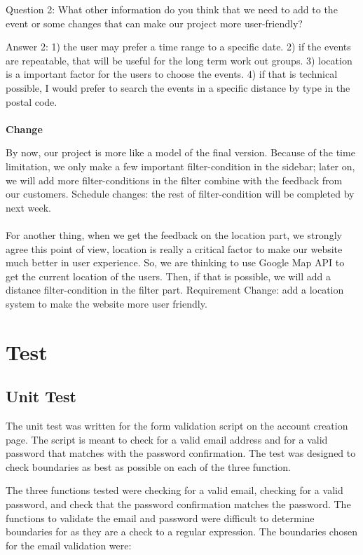\documentclass[a4paper]{article}
\begin{document}
Question 2: What other information do you think that we need to add to the event or some changes that can make our project more user-friendly?

Answer 2: 1) the user may prefer a time range to a specific date.
	     2) if the events are repeatable, that will be useful for the long term work out groups.
	     3) location is a important factor for the users to choose the events.
                 4) if that is technical possible, I would prefer to search the events in a specific distance by type in the postal code.
\\
\\
\textbf{Change}

By now, our project is more like a model of the final version. Because of the time limitation, we only make a few important filter-condition in the sidebar; later on, we will add more filter-conditions in the filter combine with the feedback from our customers. 
Schedule changes: the rest of filter-condition will be completed by next week. 
\\
\\
For another thing, when we get the feedback on the location part, we strongly agree this point of view, location is really a critical factor to make our website much better in user experience. So, we are thinking to use Google Map API to get the current location of the users. Then, if that is possible, we will add a distance filter-condition in the filter part.
Requirement Change: add a location system to make the website more user friendly.



\section{Test}
\subsection{Unit Test}

The unit test was written for the form validation script on the account creation page.
The script is meant to check for a valid email address and for a valid password that matches with the password confirmation.
The test was designed to check boundaries as best as possible on each of the three function.

The three functions tested were checking for a valid email, checking for a valid password, and check that the password confirmation matches the password.
The functions to validate the email and password were difficult to determine boundaries for as they are a check to a regular expression.
The boundaries chosen for the email validation were:
\end{document}
